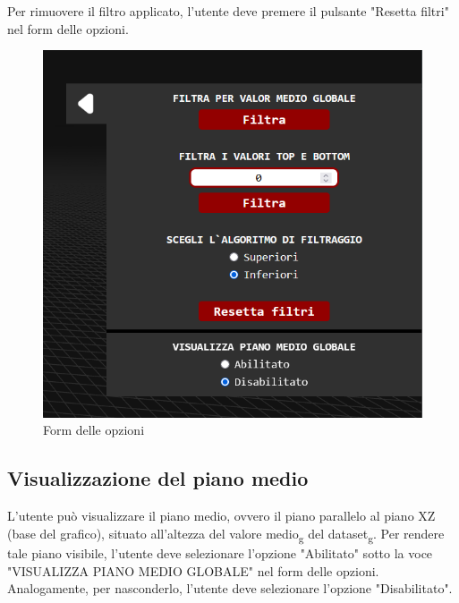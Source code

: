 Per rimuovere il filtro applicato, l'utente deve premere il pulsante "Resetta filtri" nel form delle opzioni.
\begin{figure}[ht!]
    \centering
    \includegraphics[scale=0.6]{template/images/options.png}
    \caption{Form delle opzioni}
\end{figure}

\subsection{Visualizzazione del piano medio}
L'utente può visualizzare il piano medio, ovvero il piano parallelo al
piano XZ (base del grafico), situato all'altezza del valore medio\textsubscript{g} del dataset\textsubscript{g}.
Per rendere tale piano visibile, l'utente deve selezionare l'opzione "Abilitato" sotto la voce
"VISUALIZZA PIANO MEDIO GLOBALE" nel form delle opzioni. Analogamente, per
nasconderlo, l'utente deve selezionare l'opzione "Disabilitato".


